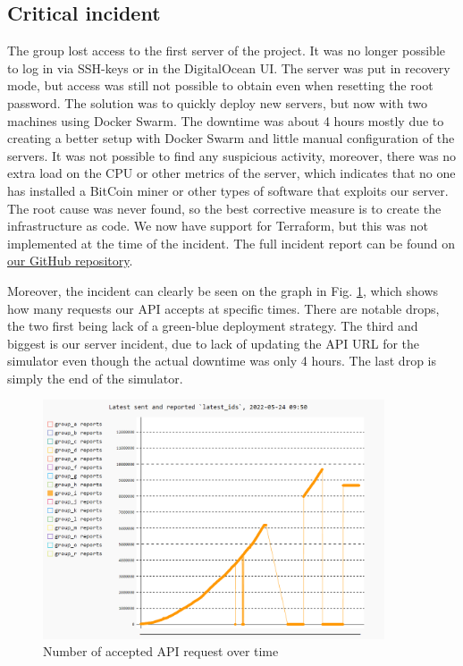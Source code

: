 \documentclass[10pt]{article}
\begin{document}
\subsection{Critical incident}
The group lost access to the first server of the project. It was no longer possible to log in via SSH-keys or in the DigitalOcean UI. The server was put in recovery mode, but access was still not possible to obtain even when resetting the root password. The solution was to quickly deploy new servers, but now with two machines using Docker Swarm. The downtime was about 4 hours mostly due to creating a better setup with Docker Swarm and little manual configuration of the servers. It was not possible to find any suspicious activity, moreover, there was no extra load on the CPU or other metrics of the server, which indicates that no one has installed a BitCoin miner or other types of software that exploits our server. The root cause was never found, so the best corrective measure is to create the infrastructure as code. We now have support for Terraform, but this was not implemented at the time of the incident. The full incident report can be found on  \href{https://github.com/Arklaide/devopsITUproject/blob/main/report/sub-reports/incident_log.md}{our GitHub repository}.

Moreover, the incident can clearly be seen on the graph in Fig. \ref{fig:latest}, which shows how many requests our API accepts at specific times. There are notable drops, the two first being lack of a green-blue deployment strategy. The third and biggest is our server incident, due to lack of updating the API URL for the simulator even though the actual downtime was only 4 hours. The last drop is simply the end of the simulator.

\begin{figure} [H]
  \centering
  \includegraphics[width=0.9\textwidth]{images/latestids.PNG}
  \caption{Number of accepted API request over time}
  \label{fig:latest}
\end{figure}
\end{document}
